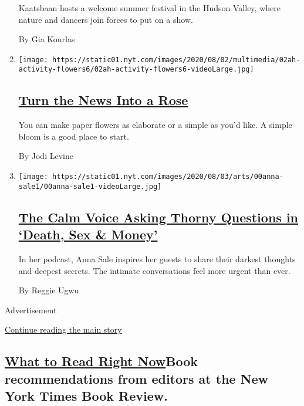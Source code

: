 \begin{enumerate}
  Kaatsbaan hosts a welcome summer festival in the Hudson Valley, where
  nature and dancers join forces to put on a show.

  By Gia Kourlas
\item
  \texttt{[image: https://static01.nyt.com/images/2020/08/02/multimedia/02ah-activity-flowers6/02ah-activity-flowers6-videoLarge.jpg]}

  \hypertarget{turn-the-news-into-a-rose}{%
  \subsection{\texorpdfstring{\href{/2020/08/01/at-home/coronavirus-paper-flowers.html}{Turn
  the News Into a
  Rose}}{Turn the News Into a Rose}}\label{turn-the-news-into-a-rose}}

  You can make paper flowers as elaborate or a simple as you'd like. A
  simple bloom is a good place to start.

  By Jodi Levine
\item
  \texttt{[image: https://static01.nyt.com/images/2020/08/03/arts/00anna-sale1/00anna-sale1-videoLarge.jpg]}

  \hypertarget{the-calm-voice-asking-thorny-questions-in-death-sex--money}{%
  \subsection{\texorpdfstring{\href{/2020/08/02/arts/anna-sale-death-sex-money-podcast.html}{The
  Calm Voice Asking Thorny Questions in `Death, Sex \&
  Money'}}{The Calm Voice Asking Thorny Questions in `Death, Sex \& Money'}}\label{the-calm-voice-asking-thorny-questions-in-death-sex--money}}

  In her podcast, Anna Sale inspires her guests to share their darkest
  thoughts and deepest secrets. The intimate conversations feel more
  urgent than ever.

  By Reggie Ugwu
\end{enumerate}

Advertisement

\protect\hyperlink{after-mid2}{Continue reading the main story}

\hypertarget{what-to-read-right-nowbook-recommendations-from-editors-at-the-new-york-times-book-review}{%
\subsection{\texorpdfstring{\href{/spotlight/books-to-read}{What to Read
Right Now}Book recommendations from editors at the New York Times Book
Review.}{What to Read Right NowBook recommendations from editors at the New York Times Book Review.}}\label{what-to-read-right-nowbook-recommendations-from-editors-at-the-new-york-times-book-review}}

